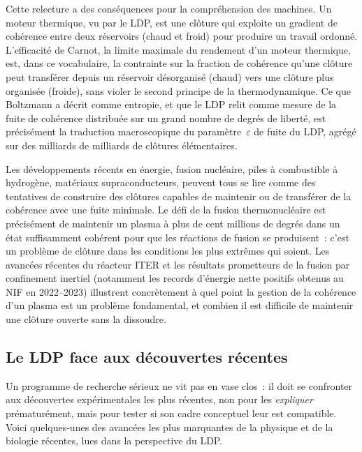 \documentclass[12pt, a4paper, openright]{book}
\begin{document}
\medskip

Cette relecture a des conséquences pour la compréhension des machines. Un moteur thermique, vu par le LDP, est une clôture qui exploite un gradient de cohérence entre deux réservoirs (chaud et froid) pour produire un travail ordonné. L'efficacité de Carnot, la limite maximale du rendement d'un moteur thermique, est, dans ce vocabulaire, la contrainte sur la fraction de cohérence qu'une clôture peut transférer depuis un réservoir désorganisé (chaud) vers une clôture plus organisée (froide), sans violer le second principe de la thermodynamique. Ce que Boltzmann a décrit comme entropie, et que le LDP relit comme mesure de la fuite de cohérence distribuée sur un grand nombre de degrés de liberté, est précisément la traduction macroscopique du paramètre~$\varepsilon$ de fuite du LDP, agrégé sur des milliards de milliards de clôtures élémentaires.

\medskip

Les développements récents en énergie, fusion nucléaire, piles à combustible à hydrogène, matériaux supraconducteurs, peuvent tous se lire comme des tentatives de construire des clôtures capables de maintenir ou de transférer de la cohérence avec une fuite minimale. Le défi de la fusion thermonucléaire est précisément de maintenir un plasma à plus de cent millions de degrés dans un état suffisamment cohérent pour que les réactions de fusion se produisent~: c'est un problème de clôture dans les conditions les plus extrêmes qui soient. Les avancées récentes du réacteur ITER et les résultats prometteurs de la fusion par confinement inertiel (notamment les records d'énergie nette positifs obtenus au NIF en 2022--2023) illustrent concrètement à quel point la gestion de la cohérence d'un plasma est un problème fondamental, et combien il est difficile de maintenir une clôture ouverte sans la dissoudre.

\subsection*{Le LDP face aux découvertes récentes}

Un programme de recherche sérieux ne vit pas en vase clos~: il doit se confronter aux découvertes expérimentales les plus récentes, non pour les \emph{expliquer} prématurément, mais pour tester si son cadre conceptuel leur est compatible. Voici quelques-unes des avancées les plus marquantes de la physique et de la biologie récentes, lues dans la perspective du LDP.
\end{document}
